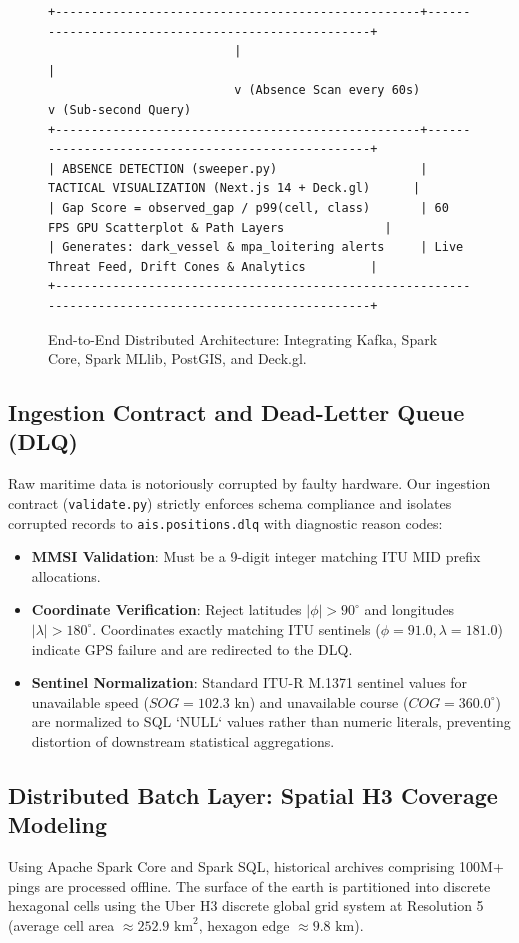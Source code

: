 \documentclass[10pt,twocolumn,a4paper]{article}
\begin{document}
\begin{figure}[t]
\begin{minipage}{0.95\textwidth}
\begin{verbatim}
+---------------------------------------------------+---------------------------------------------------+
                          |                                                   |
                          v (Absence Scan every 60s)                          v (Sub-second Query)
+---------------------------------------------------+---------------------------------------------------+
| ABSENCE DETECTION (sweeper.py)                    | TACTICAL VISUALIZATION (Next.js 14 + Deck.gl)      |
| Gap Score = observed_gap / p99(cell, class)       | 60 FPS GPU Scatterplot & Path Layers              |
| Generates: dark_vessel & mpa_loitering alerts     | Live Threat Feed, Drift Cones & Analytics         |
+-------------------------------------------------------------------------------------------------------+
\end{verbatim}
\end{minipage}
\caption{End-to-End Distributed Architecture: Integrating Kafka, Spark Core, Spark MLlib, PostGIS, and Deck.gl.}
\label{fig:architecture_diagram}
\end{figure}

\subsection{Ingestion Contract and Dead-Letter Queue (DLQ)}
Raw maritime data is notoriously corrupted by faulty hardware. Our ingestion contract (\texttt{validate.py}) strictly enforces schema compliance and isolates corrupted records to \texttt{ais.positions.dlq} with diagnostic reason codes:
\begin{itemize}[leftmargin=*]
    \item \textbf{MMSI Validation}: Must be a 9-digit integer matching ITU MID prefix allocations.
    \item \textbf{Coordinate Verification}: Reject latitudes $|\phi| > 90^\circ$ and longitudes $|\lambda| > 180^\circ$. Coordinates exactly matching ITU sentinels ($\phi = 91.0, \lambda = 181.0$) indicate GPS failure and are redirected to the DLQ.
    \item \textbf{Sentinel Normalization}: Standard ITU-R M.1371 sentinel values for unavailable speed ($SOG = 102.3\text{ kn}$) and unavailable course ($COG = 360.0^\circ$) are normalized to SQL `NULL` values rather than numeric literals, preventing distortion of downstream statistical aggregations.
\end{itemize}

\subsection{Distributed Batch Layer: Spatial H3 Coverage Modeling}
Using Apache Spark Core and Spark SQL, historical archives comprising 100M+ pings are processed offline. The surface of the earth is partitioned into discrete hexagonal cells using the Uber H3 discrete global grid system at Resolution 5 (average cell area $\approx 252.9\text{ km}^2$, hexagon edge $\approx 9.8\text{ km}$).
\end{document}
